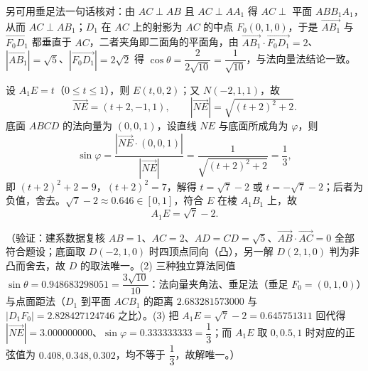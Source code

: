 \begin{answer}
另可用垂足法一句话核对：由 \(AC\perp AB\) 且 \(AC\perp AA_{1}\) 得 \(AC\perp\) 平面 \(ABB_{1}A_{1}\)，从而 \(AC\perp AB_{1}\)；\(D_{1}\) 在 \(AC\) 上的射影为 \(AC\) 的中点 \(F_{0}(0,1,0)\)，于是 \(\overrightarrow{AB_{1}}\) 与 \(\overrightarrow{F_{0}D_{1}}\) 都垂直于 \(AC\)，二者夹角即二面角的平面角，由 \(\overrightarrow{AB_{1}}\cdot\overrightarrow{F_{0}D_{1}}=2\)、\(\left|\overrightarrow{AB_{1}}\right|=\sqrt{5}\)、\(\left|\overrightarrow{F_{0}D_{1}}\right|=2\sqrt{2}\) 得 \(\cos\theta=\dfrac{2}{2\sqrt{10}}=\dfrac{1}{\sqrt{10}}\)，与法向量法结论一致。


设 \(A_{1}E=t\)（\(0\leqslant t\leqslant1\)），则 \(E(t,0,2)\)；又 \(N(-2,1,1)\)，故
\nopagebreak[4]
\[
\overrightarrow{NE}=(t+2,-1,1),\qquad \left|\overrightarrow{NE}\right|=\sqrt{(t+2)^{2}+2}.
\]
底面 \(ABCD\) 的法向量为 \((0,0,1)\)，设直线 \(NE\) 与底面所成角为 \(\varphi\)，则
\nopagebreak[4]
\[
\sin\varphi=\dfrac{\left|\overrightarrow{NE}\cdot(0,0,1)\right|}{\left|\overrightarrow{NE}\right|}
=\dfrac{1}{\sqrt{(t+2)^{2}+2}}=\dfrac{1}{3},
\]
即 \((t+2)^{2}+2=9\)，\((t+2)^{2}=7\)，解得 \(t=\sqrt{7}-2\) 或 \(t=-\sqrt{7}-2\)；后者为负值，舍去。\(\sqrt{7}-2\approx0.646\in[0,1]\)，符合 \(E\) 在棱 \(A_{1}B_{1}\) 上，故
\nopagebreak[4]
\[
A_{1}E=\sqrt{7}-2 .
\]

（验证：建系数据复核 \(AB=1\)、\(AC=2\)、\(AD=CD=\sqrt{5}\)、\(\overrightarrow{AB}\cdot\overrightarrow{AC}=0\) 全部符合题设；底面取 \(D(-2,1,0)\) 时四顶点同向（凸），另一解 \(D(2,1,0)\) 判为非凸而舍去，故 \(D\) 的取法唯一。(2) 三种独立算法同值 \(\sin\theta=0.948683298051=\dfrac{3\sqrt{10}}{10}\)：法向量夹角法、垂足法（垂足 \(F_{0}=(0,1,0)\)）与点面距法（\(D_{1}\) 到平面 \(ACB_{1}\) 的距离 \(2.683281573000\) 与 \(|D_{1}F_{0}|=2.828427124746\) 之比）。(3) 把 \(A_{1}E=\sqrt{7}-2=0.645751311\) 回代得 \(\left|\overrightarrow{NE}\right|=3.000000000\)、\(\sin\varphi=0.333333333=\dfrac{1}{3}\)；而 \(A_{1}E\) 取 \(0,0.5,1\) 时对应的正弦值为 \(0.408,0.348,0.302\)，均不等于 \(\dfrac{1}{3}\)，故解唯一。）




\end{answer}
